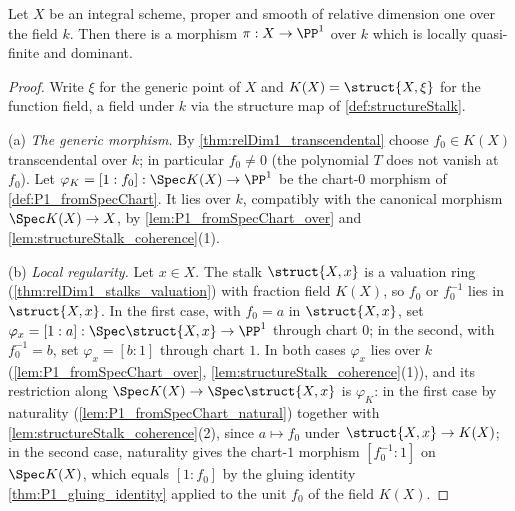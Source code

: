 \begin{theorem}
  \label{thm:exists_lqf_dominant_toP1}
  \leanok
  Let \(X\) be an integral scheme, proper and smooth of relative dimension one over the
  field \(k\). Then there is a morphism \(\pi : X \to \PP^1\) over \(k\) which is locally
  quasi-finite and dominant.
\end{theorem}
\begin{proof}
  \leanok
  Write \(\xi\) for the generic point of \(X\) and \(K(X) = \struct{X,\xi}\) for the
  function field, a field under \(k\) via the structure map of \ref{def:structureStalk}.

  (a) \emph{The generic morphism.} By \ref{thm:relDim1_transcendental} choose
  \(f_0 \in K(X)\) transcendental over \(k\); in particular \(f_0 \neq 0\) (the polynomial
  \(T\) does not vanish at \(f_0\)). Let
  \(\varphi_K = [1 : f_0] : \Spec K(X) \to \PP^1\) be the chart-\(0\) morphism of
  \ref{def:P1_fromSpecChart}. It lies over \(k\), compatibly with the canonical morphism
  \(\Spec K(X) \to X\), by \ref{lem:P1_fromSpecChart_over} and
  \ref{lem:structureStalk_coherence}(1).

  (b) \emph{Local regularity.} Let \(x \in X\). The stalk \(\struct{X,x}\) is a valuation
  ring (\ref{thm:relDim1_stalks_valuation}) with fraction field \(K(X)\), so \(f_0\) or
  \(f_0^{-1}\) lies in \(\struct{X,x}\). In the first case, with \(f_0 = a\) in
  \(\struct{X,x}\), set \(\varphi_x = [1 : a] : \Spec \struct{X,x} \to \PP^1\) through
  chart \(0\); in the second, with \(f_0^{-1} = b\), set \(\varphi_x = [b : 1]\) through
  chart \(1\). In both cases \(\varphi_x\) lies over \(k\)
  (\ref{lem:P1_fromSpecChart_over}, \ref{lem:structureStalk_coherence}(1)), and its
  restriction along \(\Spec K(X) \to \Spec \struct{X,x}\) is \(\varphi_K\): in the first
  case by naturality (\ref{lem:P1_fromSpecChart_natural}) together with
  \ref{lem:structureStalk_coherence}(2), since \(a \mapsto f_0\) under
  \(\struct{X,x} \to K(X)\); in the second case, naturality gives the chart-\(1\)
  morphism \([f_0^{-1} : 1]\) on \(\Spec K(X)\), which equals \([1 : f_0]\) by the gluing
  identity \ref{thm:P1_gluing_identity} applied to the unit \(f_0\) of the field
  \(K(X)\).


\end{proof}
